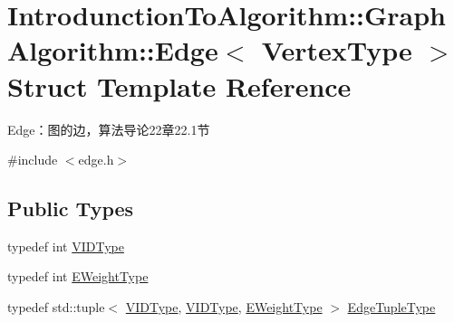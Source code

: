 \hypertarget{struct_introdunction_to_algorithm_1_1_graph_algorithm_1_1_edge}{}\section{Introdunction\+To\+Algorithm\+:\+:Graph\+Algorithm\+:\+:Edge$<$ Vertex\+Type $>$ Struct Template Reference}
\label{struct_introdunction_to_algorithm_1_1_graph_algorithm_1_1_edge}


Edge：图的边，算法导论22章22.1节  




{\ttfamily \#include $<$edge.\+h$>$}

\subsection*{Public Types}
\begin{DoxyCompactItemize}
\item 
typedef int \hyperlink{struct_introdunction_to_algorithm_1_1_graph_algorithm_1_1_edge_afe54a3bbe1f907ed578054641bf8ea07}{V\+I\+D\+Type}
\item 
typedef int \hyperlink{struct_introdunction_to_algorithm_1_1_graph_algorithm_1_1_edge_a34045c46a299bb27dab97ba7e3c554c3}{E\+Weight\+Type}
\item 
typedef std\+::tuple$<$ \hyperlink{struct_introdunction_to_algorithm_1_1_graph_algorithm_1_1_edge_afe54a3bbe1f907ed578054641bf8ea07}{V\+I\+D\+Type}, \hyperlink{struct_introdunction_to_algorithm_1_1_graph_algorithm_1_1_edge_afe54a3bbe1f907ed578054641bf8ea07}{V\+I\+D\+Type}, \hyperlink{struct_introdunction_to_algorithm_1_1_graph_algorithm_1_1_edge_a34045c46a299bb27dab97ba7e3c554c3}{E\+Weight\+Type} $>$ \hyperlink{struct_introdunction_to_algorithm_1_1_graph_algorithm_1_1_edge_adaaedd6d4205248ecf521e8585a2ecf6}{Edge\+Tuple\+Type}
\end{DoxyCompactItemize}

